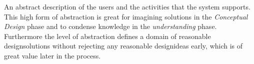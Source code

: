 \begin{tool} \label{tool:conceptual_scenario} 
  An abstract description of the users and the activities that the system supports. This high form of abstraction is great for imagining solutions in the \emph{Conceptual Design} phase and to condense knowledge in the \emph{understanding} phase. Furthermore the level of abstraction defines a domain of reasonable designsolutions without rejecting any reasonable designideas early, which is of great value later in the process. \cite[p. 63]{benyon14}
\end{tool}
